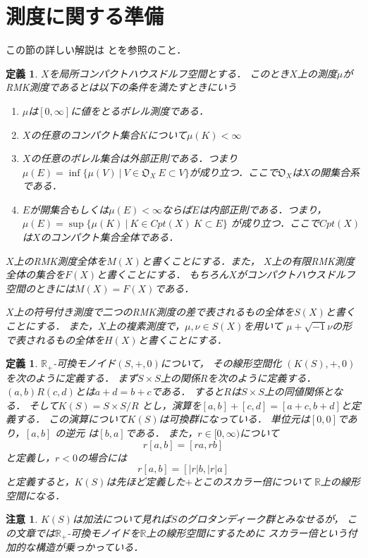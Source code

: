 \documentclass[leqno, a4paper, 12pt]{jsarticle}
\newtheorem{df}[thm]{定義}
\newtheorem*{cau}{注意}
\newcommand{\rr}{\mathbb{R}}
\begin{document}
\section{測度に関する準備}
この節の詳しい解説は
\cite{dempa1}と\cite{dempa2}を参照のこと．
\begin{df}
$X$を局所コンパクトハウスドルフ空間とする．
このとき$X$上の測度$\mu$がRMK測度であるとは以下の条件を満たすときにいう
\begin{enumerate}
\item $\mu$は$[0, \infty]$に値をとるボレル測度である．
\item $X$の任意のコンパクト集合$K$について$\mu(K)<\infty$
\item $X$の任意のボレル集合は外部正則である．つまり
$\mu(E)=\inf\{\mu(V)\ |\ V\in \mathfrak{O}_X\ E\subset V\}$が成り立つ．ここで$\mathfrak{O}_X$は$X$の開集合系である．
\item $E$が開集合もしくは$\mu(E)<\infty$ならば$E$は内部正則である．つまり，
$\mu(E)=\sup\{\mu(K)\ |\ K\in Cpt(X) \ K\subset E\}$
が成り立つ．ここで$Cpt(X)$は$X$のコンパクト集合全体である．
\end{enumerate}

$X$上のRMK測度全体を$M(X)$と書くことにする．また，
$X$上の有限RMK測度全体の集合を$F(X)$と書くことにする．
もちろん$X$がコンパクトハウスドルフ空間のときには$M(X)=F(X)$である．

$X$上の符号付き測度で二つのRMK測度の差で表されるもの全体を$S(X)$と書くことにする．
また，$X$上の複素測度で，$\mu, \nu\in S(X)$を用いて
$\mu+\sqrt{-1}\nu$の形で表されるもの全体を$H(X)$と書くことにする．
\end{df}


\begin{df}
$\rr_+$-可換モノイド$(S, +, 0)$について，
その線形空間化
$(K(S), +, 0)$を次のように定義する．
 まず$S\times S$上の関係$R$を次のように定義する．
  $(a, b)R(c, d)$とは$a+d=b+c$である．
  すると$R$は$S\times S$上の同値関係となる．
  そして$K(S)=S\times S/R$
  とし，演算を$[a, b]+[c, d]=[a+c, b+d]$と定義する．
 この演算について$K(S)$は可換群になっている．
 単位元は$[0, 0]$であり，$[a, b]$
 の逆元
 は$[b, a]$である．
 また，$r\in [0, \infty)$について
 \[
 r[a, b]=[ra, rb]
 \]
 と定義し，$r<0$の場合には
 \[
 r[a, b]=[|r|b, |r|a]
 \]
 と定義すると，$K(S)$は先ほど定義した$+$とこのスカラー倍について
 $\rr$上の線形空間になる．
 \end{df}

\begin{cau}
$K(S)$は加法について見れば$S$のグロタンディーク群とみなせるが，
この文章では$\rr_+$-可換モノイドを$\rr$上の線形空間にするために
スカラー倍という付加的な構造が乗っかっている．
\end{cau}
\end{document}
